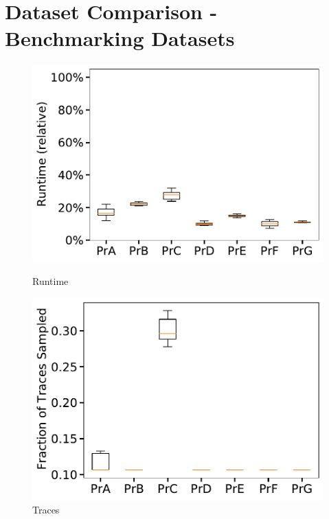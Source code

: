 \documentclass[landscape]{article}
\begin{document}
	\section*{Dataset Comparison - Benchmarking Datasets}
			\begin{figure}[!htb]
		\centering
		\begin{minipage}{0.32\textwidth}
			\includegraphics[width=1.0\textwidth]{../benchmark_computing_time.pdf}
			\caption{Runtime}
		\end{minipage}
		\hfill
		\begin{minipage}{0.32\textwidth}
			\includegraphics[width=1.0\textwidth]{../benchmark_traces.pdf}
			\caption{Traces}
		\end{minipage}
		\hfill
		\begin{minipage}{0.32\textwidth}

\end{minipage}
\end{figure}
\end{document}
